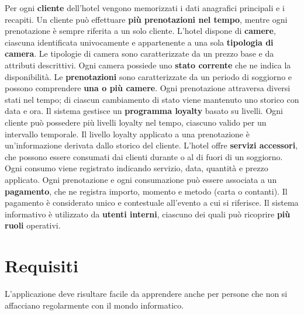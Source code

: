 \documentclass[a4paper,12pt]{report}
\begin{document}
Per ogni \textbf{cliente} dell’hotel vengono memorizzati i dati anagrafici principali e i recapiti.
Un cliente può effettuare \textbf{più prenotazioni nel tempo}, mentre ogni prenotazione è sempre riferita a un solo cliente.
\medskip
\newline
L’hotel dispone di \textbf{camere}, ciascuna identificata univocamente e appartenente a una sola \textbf{tipologia di camera}.
Le tipologie di camera sono caratterizzate da un prezzo base e da attributi descrittivi.
Ogni camera possiede uno \textbf{stato corrente} che ne indica la disponibilità.
\medskip
\newline
Le \textbf{prenotazioni} sono caratterizzate da un periodo di soggiorno e possono comprendere \textbf{una o più camere}.
Ogni prenotazione attraversa diversi stati nel tempo; di ciascun cambiamento di stato viene mantenuto uno storico con data e ora.
\medskip
\newline
Il sistema gestisce un \textbf{programma loyalty} basato su livelli.
Ogni cliente può possedere più livelli loyalty nel tempo, ciascuno valido per un intervallo temporale.
Il livello loyalty applicato a una prenotazione è un’informazione derivata dallo storico del cliente.
\medskip
\newline
L’hotel offre \textbf{servizi accessori}, che possono essere consumati dai clienti durante o al di fuori di un soggiorno.
Ogni consumo viene registrato indicando servizio, data, quantità e prezzo applicato.
\medskip
\newline
Ogni prenotazione e ogni consumazione può essere associata a un
\textbf{pagamento}, che ne registra importo, momento e metodo (carta o
contanti). Il pagamento è considerato unico e contestuale all'evento a
cui si riferisce.
\medskip
\newline
Il sistema informativo è utilizzato da \textbf{utenti interni}, ciascuno dei quali può ricoprire \textbf{più ruoli} operativi.


\section{Requisiti}

L'applicazione deve risultare facile da apprendere anche per persone che non si affacciano regolarmente con il mondo informatico.
\end{document}
